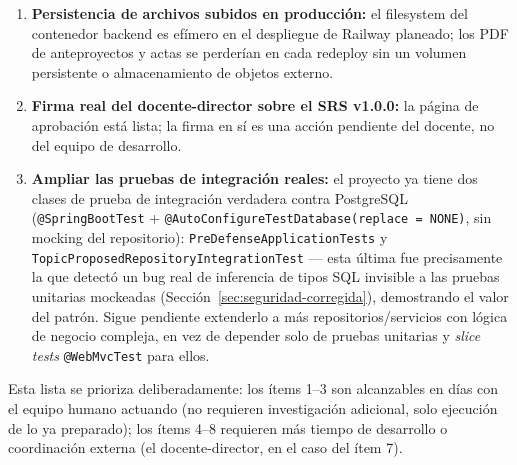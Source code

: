 \begin{enumerate}[nosep]
    es una búsqueda dirigida, no una SLR completa con protocolo pre-registrado y doble revisor
    independiente, siguiendo Kitchenham y Charters \cite{kitchenham2007}.
    \item \textbf{Persistencia de archivos subidos en producción:} el filesystem del contenedor backend
    es efímero en el despliegue de Railway planeado; los PDF de anteproyectos y actas se perderían en
    cada redeploy sin un volumen persistente o almacenamiento de objetos externo.
    \item \textbf{Firma real del docente-director sobre el SRS v1.0.0:} la página de aprobación está
    lista; la firma en sí es una acción pendiente del docente, no del equipo de desarrollo.
    \item \textbf{Ampliar las pruebas de integración reales:} el proyecto ya tiene dos clases de prueba
    de integración verdadera contra PostgreSQL (\texttt{@SpringBootTest} +
    \texttt{@AutoConfigureTestDatabase(replace = NONE)}, sin mocking del repositorio):
    \texttt{PreDefenseApplicationTests} y \texttt{TopicProposedRepositoryIntegrationTest} --- esta
    última fue precisamente la que detectó un bug real de inferencia de tipos SQL invisible a las
    pruebas unitarias mockeadas (Sección~\ref{sec:seguridad-corregida}), demostrando el valor del
    patrón. Sigue pendiente extenderlo a más repositorios/servicios con lógica de negocio compleja, en
    vez de depender solo de pruebas unitarias y \textit{slice tests} \texttt{@WebMvcTest} para ellos.
\end{enumerate}

Esta lista se prioriza deliberadamente: los ítems 1--3 son alcanzables en días con el equipo humano
actuando (no requieren investigación adicional, solo ejecución de lo ya preparado); los ítems 4--8
requieren más tiempo de desarrollo o coordinación externa (el docente-director, en el caso del ítem 7).
\newpage
